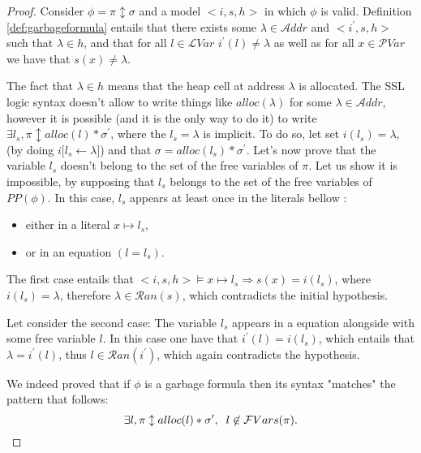 \documentclass[a4paper,twoside,12pt]{report}
\newcommand\Addr{\mathcal{A}ddr} %
\newcommand\LVar{\mathcal{L}Var} %
\newcommand\PVar{\mathcal{P}Var} %
\newcommand{\Pp}[1]{PP(#1)} %
\newcommand{\Alloc}[1]{alloc(#1)}
\newcommand{\Unsep}[0]{\ast}
\newcommand{\Sep}[2]{#1 \Unsep #2}
\newcommand{\EqLoc}[2]{ (#1 = #2) }
\newcommand{\Pointsto}[2]{ #1 \mapsto #2}
\newcommand{\Formula}[2]{ #1  \updownarrow #2}
\newcommand{\Ran}[1]{\mathcal{R}an(#1)}
\newcommand{\FVars}[1]{\mathcal{F}Vars(#1)}
\newcommand{\Subst}[3]{#3\lbrack #1\leftarrow #2 \rbrack}
\begin{document}
\begin{proof}
Consider $\phi =\Formula{\pi}{\sigma}$ and a model $<i,s,h>$ in which $\phi$ is valid.
Definition \ref{def:garbageformula} entails that there exists some $\lambda \in \Addr$ and $<i^{\prime},s,h>$ such that $\lambda\in h$, and that for all $l\in \LVar$ $i^{\prime}(l)\neq \lambda$ as well as for all $x \in \PVar$ we have that $s(x)\neq \lambda$.


The fact that $\lambda\in h$ means that the heap cell at address $\lambda$ is allocated. The SSL logic syntax doesn't allow to write things like $\Alloc{\lambda}$ for some $\lambda \in \Addr$, however it is possible (and it is the only way
to do it) to write $\exists l_s, \Formula{\pi}{\Sep{\Alloc{l}}{\sigma^{\prime}}}$, where the $l_s=\lambda$ is implicit.
To do so, let set $i(l_s)=\lambda$, (by doing $\Subst{l_s}{\lambda}{i}$) and that $\sigma=\Sep{\Alloc{l_s}}{\sigma^{\prime}}$. 
Let's now prove that the variable $l_s$ doesn't belong to the set of
the free variables of $\pi$.
Let us show it is impossible, by supposing that $l_s$ belongs to the set of
 the free variables of $\Pp{\phi}$. In this case, $l_s$ appears at least once in the literals bellow :

\begin{itemize}
\item either in a literal $\Pointsto{x}{l_s}$,
\item or in an equation $\EqLoc{l}{l_s}$.
\end{itemize}
 The first case entails that $<i,s,h>\models \Pointsto{x}{l_s} \Rightarrow s(x)=i(l_s)$, where $i(l_s)=\lambda$, therefore $\lambda\in \Ran{s}$, which contradicts the initial hypothesis.

Let consider the second case: The variable $l_s$ appears in a equation alongside with some free variable $l$. In this case one have that $i^{\prime}(l)=i(l_s)$, which entails that $\lambda=i^{\prime}(l)$, thus $l\in \Ran{i^{\prime}}$,
which again contradicts the hypothesis.

%

We indeed proved that if $\phi$ is a garbage formula then its syntax "matches"
the pattern that follows:
$$
\exists l, \Formula{\pi}{\Sep{\Alloc{l}}{\sigma^{\prime}}}, \gspace l\not\in \FVars{\pi}.
$$
\end{proof}
\end{document}
